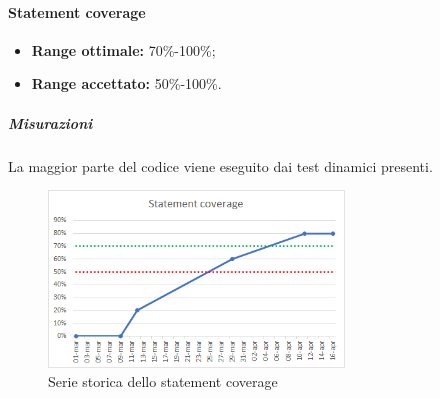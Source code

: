 			\paragraph{Statement coverage} \Spazio
				\begin{itemize}
					\item \textbf{Range ottimale:} 70\%-100\%;
					\item \textbf{Range accettato:} 50\%-100\%.
		    	\end{itemize}
	    	    \subparagraph{Misurazioni}
	    	    La maggior parte del codice viene eseguito dai test dinamici presenti.
	    	    \begin{figure}[H]
	    	    	\centering 
	    	    	\includegraphics[width=0.7\textwidth]{Images/statement.png}
	    	    	\caption{Serie storica dello statement coverage}
	    	    	\label{statement} 
	    	    \end{figure}
    	        
